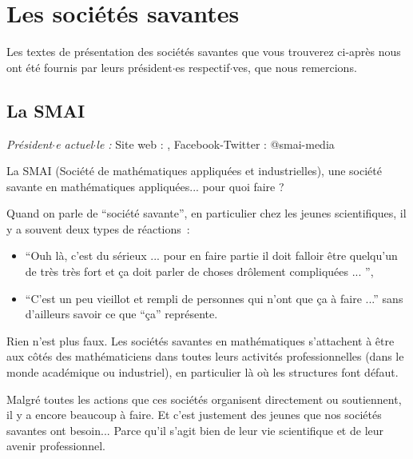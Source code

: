 
\chapter{Les soci\'et\'es savantes}

Les textes de pr\'esentation des soci\'et\'es savantes que vous
trouverez ci-apr\`es nous ont \'et\'e fournis par leurs pr\'esident$\cdot$es
respectif$\cdot$ves, que nous remercions.



\section{La SMAI}

\emph{Pr\'esident$\cdot$e actuel$\cdot$le : } \hfill Site web : , Facebook-Twitter : @smai-media
\smallskip

La SMAI (Soci\'et\'e de math\'ematiques appliqu\'ees et
industrielles), une soci\'et\'e savante en math\'ematiques
appliqu\'ees... pour quoi faire ?

Quand on parle de ``soci\'et\'e savante'', en particulier chez
les jeunes scientifiques, il y a souvent deux types de
r\'eactions~:
\begin{itemize}%
    \item ``Ouh l\`a, c'est du s\'erieux ...
pour en faire partie il doit falloir \^etre quelqu'un de tr\`es
tr\`es fort et \c{c}a doit parler de choses dr\^olement
compliqu\'ees ... '',
\item ``C'est un peu vieillot et rempli de personnes qui
n'ont que \c ca \`a faire ...''
sans d'ailleurs savoir ce que ``\c ca''
repr\'esente.
\end{itemize}

Rien n'est plus faux. Les soci\'et\'es savantes en math\'ematiques
s'attachent \`a \^etre aux c\^ot\'es des math\'ematiciens dans
toutes leurs activit\'es professionnelles
(dans le monde acad\'emique ou industriel),
en particulier l\`a o\`u les structures font d\'efaut.

Malgr\'e toutes les actions que ces soci\'et\'es organisent
directement ou soutiennent, il y a encore beaucoup \`a
faire. Et c'est justement des jeunes que nos soci\'et\'es savantes ont
besoin... Parce qu'il s'agit bien de leur vie scientifique et
de leur avenir professionnel.

